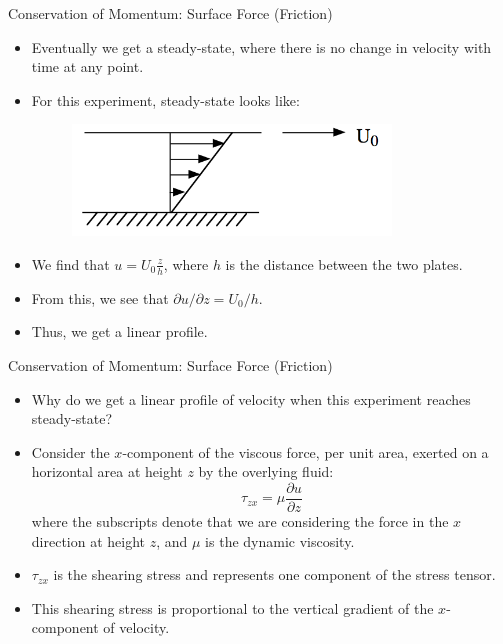 \begin{frame}{Conservation of Momentum: Surface Force (Friction)}
\begin{itemize}
	\item Eventually we get a steady-state, where there is no change in velocity with time at any point.
	\item For this experiment, steady-state looks like:
	\begin{figure}
		\includegraphics[width=0.8\textwidth]{friction3.png}
	\end{figure}
	\item We find that $u = U_0 \frac{z}{h}$, where $h$ is the distance between the two plates.
	\item From this, we see that $\partial u / \partial z = U_0 / h$.
	\item Thus, we get a linear profile.
\end{itemize}
\end{frame}
\begin{frame}{Conservation of Momentum: Surface Force (Friction)}
\begin{itemize}
	\item Why do we get a linear profile of velocity when this experiment reaches steady-state?
	\item Consider the $x$-component of the viscous force, per unit area, exerted on a horizontal area at height $z$ by the overlying fluid:
	$$\tau_{zx} = \mu \frac{\partial u}{\partial z}$$
	where the subscripts denote that we are considering the force in the $x$ direction at height $z$, and $\mu$ is the dynamic viscosity.
	\item $\tau_{zx}$ is the shearing stress and represents one component of the stress tensor.
	\item This shearing stress is proportional to the vertical gradient of the $x$-component of velocity.
\end{itemize}
\end{frame}
